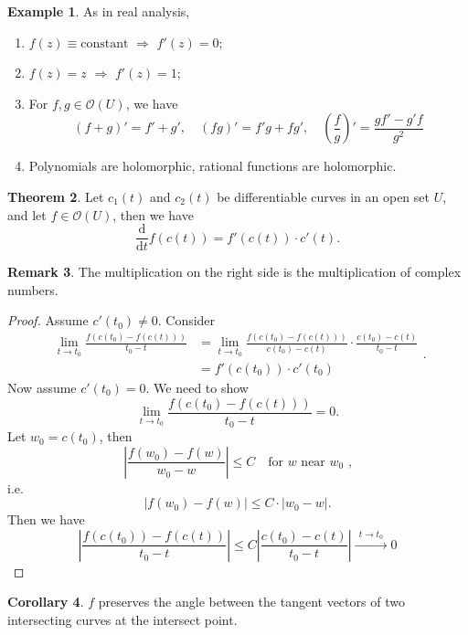 \documentclass[12pt,reqno]{article}
\newcommand{\OO}{\mathcal{O}}
\newcommand{\rd}{\mathrm{d}} %
\theoremstyle{definition}
\newtheorem{theorem}{Theorem}[section]
\newtheorem{corollary}[theorem]{Corollary}
\newtheorem{example}[theorem]{Example}
\newtheorem{remark}[theorem]{Remark}
\begin{document}
\begin{example}
As in real analysis, 
\begin{enumerate}
\item $f(z)\equiv \text{constant}$ $\Rightarrow$ $f'(z)=0$;
\item $f(z)=z$ $\Rightarrow$ $f'(z)=1$;
\item For $f,g\in \OO(U)$, we have
\[(f+g)'=f'+g',\quad (fg)'=f'g+fg',\quad \left(\frac{f}{g}\right)'=\frac{gf'-g'f}{g^2}\]
\item Polynomials are holomorphic, rational functions are holomorphic.
\end{enumerate}
\end{example}

\begin{theorem}
Let $c_1(t)$ and $c_2(t)$ be differentiable curves in an open set $U$, and let $f\in \OO(U)$, then we have
\[\frac{\rd}{\rd t}f(c(t))=f'(c(t))\cdot c'(t).\]
\end{theorem}
\begin{remark}
The multiplication on the right side is the multiplication of complex numbers.
\end{remark}
\begin{proof}
Assume $c'(t_0)\neq 0$. Consider
\[\begin{aligned}\lim_{t\to t_0} \frac{f(c(t_0)-f(c(t)))}{t_0-t}&=\lim_{t\to t_0} \frac{f(c(t_0)-f(c(t)))}{c(t_0)-c(t)}\cdot\frac{c(t_0)-c(t)}{t_0-t}\\
&=f'(c(t_0))\cdot c'(t_0)\end{aligned}.\]
Now assume $c'(t_0)=0$. We need to show
\[\lim_{t\to t_0} \frac{f(c(t_0)-f(c(t)))}{t_0-t}=0.\]
Let $w_0=c(t_0)$, then 
\[\left|\frac{f(w_0)-f(w)}{w_0-w}\right|\leq C \quad \text{for $w$ near $w_0$ ,}\]
i.e.
\[\left|f(w_0)-f(w)\right|\leq C \cdot\left|w_0-w\right|.\]
Then we have 
\[\left|\frac{f(c(t_0))-f(c(t))}{t_0-t}\right|\leq C\left|\frac{c(t_0)-c(t)}{t_0-t}\right|\xrightarrow{\ ~t\to t_0~\ } 0\]
\end{proof}
\begin{corollary}
$f$ preserves the angle between the tangent vectors of two intersecting curves at the intersect point.
\end{corollary}
\end{document}
